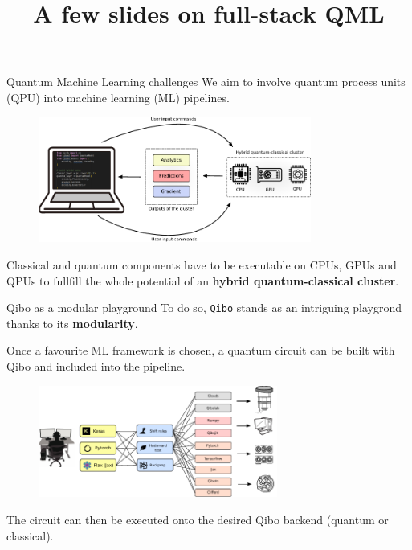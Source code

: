 \documentclass[aspectratio=169, 8pt, xcolor={svgnames}, hyperref={linkcolor=black}]{beamer}
\title{A few slides on full-stack QML}
\begin{document}
\begin{frame}
\maketitle
\end{frame}

\begin{frame}{Quantum Machine Learning challenges}
We aim to involve quantum process units (QPU) into machine learning (ML) pipelines.
\begin{figure}
   \includegraphics[width=0.8\textwidth]{figures/hybrid_qml.pdf}
\end{figure}
Classical and quantum components have to be executable on CPUs, GPUs and QPUs to
fullfill the whole potential of an \textbf{hybrid quantum-classical cluster}.
\end{frame}

\begin{frame}{Qibo as a modular playground}
To do so, \texttt{Qibo} stands as an intriguing playgrond thanks to its \textbf{modularity}.

Once a favourite ML framework is chosen, a quantum circuit can be built with Qibo
and included into the pipeline. 
\begin{figure}
   \includegraphics[width=0.7\textwidth]{figures/qiboml_nn_2.pdf}
\end{figure}
The circuit can then be executed onto the desired Qibo backend (quantum or classical).
\end{frame}
\end{document}
